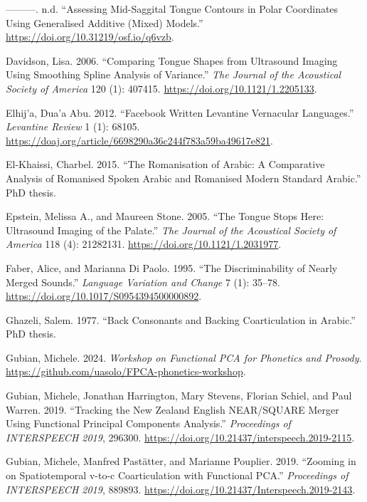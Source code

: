 \documentclass[
]{interact}
\newlength{\cslhangindent}
\newenvironment{CSLReferences}[2] %
 {\begin{list}{}{%
  \setlength{\itemindent}{0pt}
  \setlength{\leftmargin}{0pt}
  \setlength{\parsep}{0pt}
  \ifodd #1
   \setlength{\leftmargin}{\cslhangindent}
   \setlength{\itemindent}{-1\cslhangindent}
  \fi
  \setlength{\itemsep}{#2\baselineskip}}}
 {\end{list}}
\begin{document}
\begin{CSLReferences}{1}{0}
---------. n.d. {``Assessing Mid-Saggital Tongue Contours in Polar
Coordinates Using Generalised Additive (Mixed) Models.''}
\url{https://doi.org/10.31219/osf.io/q6vzb}.

Davidson, Lisa. 2006. {``Comparing Tongue Shapes from Ultrasound Imaging
Using Smoothing Spline Analysis of Variance.''} \emph{The Journal of the
Acoustical Society of America} 120 (1): 407415.
\url{https://doi.org/10.1121/1.2205133}.

Elhij'a, Dua'a Abu. 2012. {``Facebook Written Levantine Vernacular
Languages.''} \emph{Levantine Review} 1 (1): 68105.
\url{https://doaj.org/article/6698290a36c244f783a59ba49617e821}.

El-Khaissi, Charbel. 2015. {``The Romanisation of Arabic: A Comparative
Analysis of Romanised Spoken Arabic and Romanised Modern Standard
Arabic.''} PhD thesis.

Epstein, Melissa A., and Maureen Stone. 2005. {``The Tongue Stops Here:
Ultrasound Imaging of the Palate.''} \emph{The Journal of the Acoustical
Society of America} 118 (4): 21282131.
\url{https://doi.org/10.1121/1.2031977}.

Faber, Alice, and Marianna Di Paolo. 1995. {``The Discriminability of
Nearly Merged Sounds.''} \emph{Language Variation and Change} 7 (1):
35--78. \url{https://doi.org/10.1017/S0954394500000892}.

Ghazeli, Salem. 1977. {``Back Consonants and Backing Coarticulation in
Arabic.''} PhD thesis.

Gubian, Michele. 2024. \emph{Workshop on Functional PCA for Phonetics
and Prosody}. \url{https://github.com/uasolo/FPCA-phonetics-workshop}.

Gubian, Michele, Jonathan Harrington, Mary Stevens, Florian Schiel, and
Paul Warren. 2019. {``Tracking the New Zealand English NEAR/SQUARE
Merger Using Functional Principal Components Analysis.''}
\emph{Proceedings of INTERSPEECH 2019}, 296300.
\url{https://doi.org/10.21437/interspeech.2019-2115}.

Gubian, Michele, Manfred Pastätter, and Marianne Pouplier. 2019.
{``Zooming in on Spatiotemporal v-to-c Coarticulation with Functional
PCA.''} \emph{Proceedings of INTERSPEECH 2019}, 889893.
\url{https://doi.org/10.21437/Interspeech.2019-2143}.


\end{CSLReferences}
\end{document}
